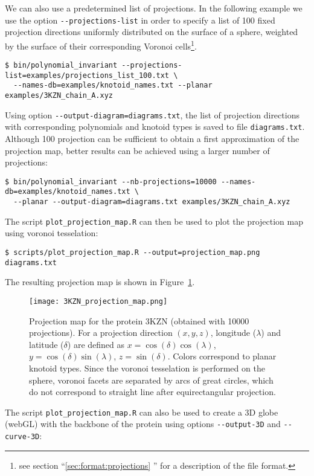 We can also use a predetermined list of projections. In the following example we use the option \lstinline{--projections-list} in order to specify a list of 100 fixed projection directions uniformly distributed on the surface of a sphere, weighted by the surface of their corresponding Voronoi cells\footnote{see section ``\ref{sec:format:projections} '' for a description of the file format.}. 
\begin{lstlisting}
$ bin/polynomial_invariant --projections-list=examples/projections_list_100.txt \ 
  --names-db=examples/knotoid_names.txt --planar examples/3KZN_chain_A.xyz
\end{lstlisting}

Using option \lstinline{--output-diagram=diagrams.txt}, the list of projection directions with corresponding polynomials and knotoid types is saved to file \lstinline{diagrams.txt}. Although 100 projection can be sufficient to obtain a first approximation of the projection map, better results can be achieved using a larger number of projections:
\begin{lstlisting}
$ bin/polynomial_invariant --nb-projections=10000 --names-db=examples/knotoid_names.txt \
  --planar --output-diagram=diagrams.txt examples/3KZN_chain_A.xyz
\end{lstlisting}
The script \lstinline{plot_projection_map.R} can then be used to plot the projection map using voronoi tesselation:
\begin{lstlisting}
$ scripts/plot_projection_map.R --output=projection_map.png diagrams.txt
\end{lstlisting}
The resulting projection map is shown in Figure~\ref{fig:3KZN:projectionmap}.
\begin{figure}[t]
\centering
\texttt{[image: 3KZN\_projection\_map.png]}
\caption{Projection map for the protein 3KZN (obtained with 10000 projections).  For a projection direction $(x,y,z)$, longitude ($\lambda$) and latitude ($\delta$) are defined as $x=\cos(\delta)\cos(\lambda)$, $y=\cos(\delta)\sin(\lambda)$, $z=\sin(\delta)$. Colors correspond to planar knotoid types. Since the voronoi tesselation is performed on the sphere, voronoi facets are separated by arcs of great circles, which do not correspond to straight line after equirectangular projection.}\label{fig:3KZN:projectionmap}
\end{figure}
The script \lstinline{plot_projection_map.R} can also be used to create a 3D globe (webGL) with the backbone of the protein using options \lstinline{--output-3D} and \lstinline{--curve-3D}:
